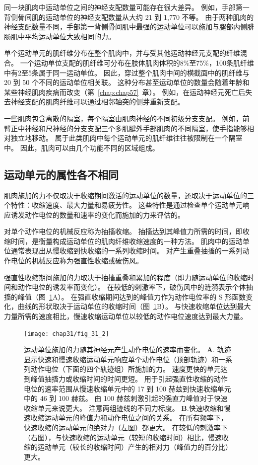 同一块肌肉中运动单位之间的神经支配数量可能存在很大差异。
例如，手部第一背侧骨间肌的运动单位的神经支配数量从大约 21 到 1,770 不等。
由于两种肌肉的神经支配数量不同，手部第一背侧骨间肌中最强的运动单位可以施加与腿部内侧腓肠肌中平均运动单位大致相同的力。


单个运动单元的肌纤维分布在整个肌肉中，并与受其他运动神经元支配的纤维混合。
一个运动单位支配的肌纤维可分布在肢体肌肉体积的8\%至75\%，100条肌纤维中有2至5条属于同一运动单位。
因此，穿过整个肌肉中间的横截面中的肌纤维与 20 到 50 个不同的运动单位相关联。
这种分布甚至运动单位的数量会随着年龄和某些神经肌肉疾病而改变（第~\ref{chap:chap57}~章）。
例如，在运动神经元死亡后失去神经支配的肌肉纤维可以通过相邻轴突的侧芽重新支配。


一些肌肉包含离散的隔室，每个隔室由肌肉神经的不同初级分支支配。
例如，前臂正中神经和尺神经的分支支配三个多肌腱外手部肌肉的不同隔室，使手指能够相对独立地移动。
属于此类肌肉中每个运动单元的肌纤维往往被限制在一个隔室中。
因此，肌肉可以由几个功能不同的区域组成。



\subsection{运动单元的属性各不相同}

肌肉施加的力不仅取决于收缩期间激活的运动单位的数量，还取决于运动单位的三个特性：收缩速度、最大力量和易疲劳性。
这些特性是通过检查单个运动单元响应诱发动作电位的数量和速率的变化而施加的力来评估的。


对单个动作电位的机械反应称为抽搐收缩。
抽搐达到其峰值力所需的时间，即收缩时间，是衡量构成运动单位的肌肉纤维收缩速度的一种方法。
肌肉中的运动单位通常表现出从慢收缩到快收缩的一系列收缩时间。
对产生重叠抽搐的一系列动作电位的机械反应称为强直性收缩或破伤风。


强直性收缩期间施加的力取决于抽搐重叠和累加的程度（即力随运动单位的收缩时间和动作电位的诱发率而变化）。
在较低的刺激率下，破伤风中的涟漪表示个体抽搐的峰值（图~\ref{fig:31_2}A）。 
在强直收缩期间达到的峰值力作为动作电位率的 S 形函数变化，曲线的形状取决于运动单位的收缩时间（图~\ref{fig:31_2}B）。
与快速收缩单位达到最大力量所需的速度相比，慢速收缩运动单位以较低的动作电位速度达到最大力量。


\begin{figure}[htbp]
	\centering
	\texttt{[image: chap31/fig\_31\_2]}
	\caption{运动单位施加的力随其神经元产生动作电位的速率而变化。
		\textbf{A}. 轨迹显示快速和慢速收缩运动单元响应单个动作电位（顶部轨迹）和一系列动作电位（下面的四个轨迹组）所施加的力。
	速度更快的单元达到峰值抽搐力或收缩时间的时间更短。
	用于引起强直性收缩的动作电位的速率范围从慢速收缩单元中的 17 到 100 赫兹到快速收缩单元中的 46 到 100 赫兹。
	由 100 赫兹刺激引起的强直力峰值对于快速收缩单元来说更大。
	注意两组迹线的不同力标度\cite{botterman1986gradation,fuglevand1999force,macefield1996contractile}。
	\textbf{B}.快速收缩和慢速收缩运动单元的峰值力和动作电位之间的关系。
	在所有频率下，快速收缩的运动单元的绝对力（左图）都更大。
	在较低的刺激率下（右图），与快速收缩的运动单元（较短的收缩时间）相比，慢速收缩的运动单元（较长的收缩时间）产生的相对力（峰值力的百分比）更大。}
	\label{fig:31_2}
\end{figure}



